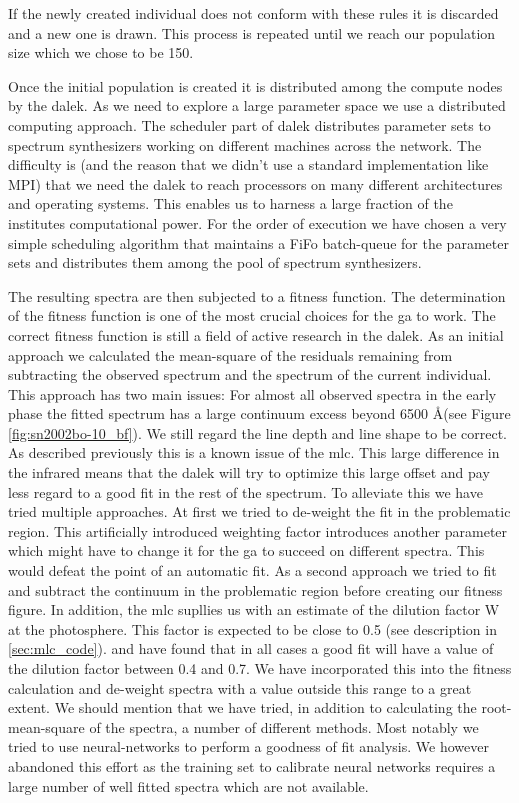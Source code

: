 If the newly created individual does not conform with these rules it is discarded and a new one is drawn. This process is repeated until we reach our population size which we chose to be 150.

Once the initial population is created it is distributed among the compute nodes by the \gls{dalek}. As we need to explore a large parameter space we use a distributed computing approach. The scheduler part of \gls{dalek} distributes parameter sets to spectrum synthesizers working on different machines across the network. The difficulty is (and the reason that we didn't use a standard implementation like MPI) that we need the \gls{dalek} to reach processors on many different architectures and operating systems. This enables us to harness a large fraction of the institutes computational power. For the order of execution we have chosen a very simple scheduling algorithm that maintains a FiFo batch-queue for the parameter sets and distributes them among the pool of spectrum synthesizers.

The resulting spectra are then subjected to a fitness function. The determination of the fitness function is one of the most crucial  choices for the \gls{ga} to work. The correct fitness function is still a field of active research in the \gls{dalek}. As an initial approach we calculated the mean-square of the residuals remaining from subtracting the observed spectrum and the spectrum of the current individual. This approach has two main issues: For almost all observed spectra in the early phase the fitted spectrum has a large continuum excess beyond 6500 \AA (see Figure \ref{fig:sn2002bo-10_bf}). We still regard the line depth and line shape to be correct. As described previously this is a known issue of the \gls{mlc}. This large difference in the infrared means that the \gls{dalek} will try to optimize this large offset and pay less regard to a good fit in the rest of the spectrum. To alleviate this we have tried multiple approaches. At first we tried to de-weight the fit in the problematic region. This artificially introduced weighting factor introduces another parameter which might have to change it for the \gls{ga} to succeed on different spectra. This would defeat the point of an automatic fit. As a second approach we tried to fit and subtract the continuum in the problematic region before creating our fitness figure. 
In addition, the \gls{mlc} supllies us with an estimate of the dilution factor W at the photosphere. This factor is expected to be close to 0.5 (see description in \ref{sec:mlc_code}). \citet{hachinger_dipl2007} and \citet{hachinger_phd2011} have found that in all cases a good fit will have a value of the dilution factor between 0.4 and 0.7. We have incorporated this into the fitness calculation and de-weight spectra with a value outside this range to a great extent.
We should mention that we have tried, in addition to calculating the root-mean-square of the spectra, a number of different methods. Most notably we tried to use neural-networks to perform a goodness of fit analysis. We however abandoned this effort as the training set to calibrate neural networks requires a large number of well fitted spectra which are not available. 

